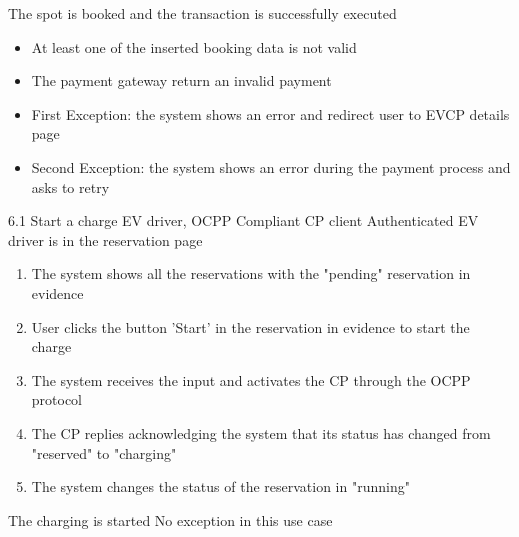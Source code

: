 {The spot is booked and the transaction is successfully executed}
{
    \begin{itemize}
        \item At least one of the inserted booking data is not valid
        \item The payment gateway return an invalid payment
    \end{itemize}
}
{
    \begin{itemize}
        \item First Exception: the system shows an error and redirect user to EVCP details page
        \item Second Exception: the system shows an error during the payment process and asks to retry
    \end{itemize}
}

\usecase
{
}
{6.1}
{Start a charge}
{EV driver, OCPP Compliant CP client}
{Authenticated EV driver is in the reservation page}
{
    \begin{enumerate}
        \item The system shows all the reservations with the "pending" reservation in evidence
        \item User clicks the button 'Start' in the reservation in evidence to start the charge
        \item The system receives the input and activates the CP through the OCPP protocol
        \item The CP replies acknowledging the system that its status has changed from "reserved" to "charging"
        \item The system changes the status of the reservation in "running"
    \end{enumerate}
}
{The charging is started}
{
    No exception in this use case
}
{
}

